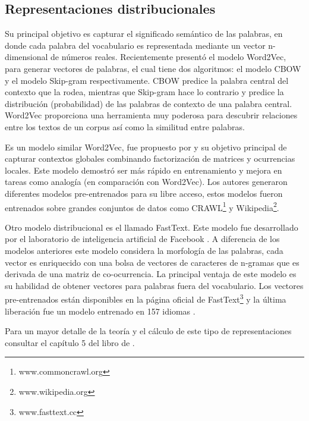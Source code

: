 \subsection{Representaciones distribucionales}
Su principal objetivo es capturar el significado semántico de las palabras, en donde cada palabra del vocabulario es representada mediante un vector n-dimensional de números reales. Recientemente \citep{mikolov2013distributed} presentó el modelo Word2Vec, para generar vectores de palabras, el cual tiene dos algoritmos: el modelo CBOW y el modelo Skip-gram respectivamente. CBOW  predice la palabra central del contexto que la rodea, mientras que Skip-gram hace lo contrario y predice la distribución (probabilidad) de las palabras de contexto de una palabra central. Word2Vec proporciona una herramienta muy poderosa para descubrir relaciones entre los textos de un corpus así como la similitud entre palabras.

Es un modelo similar Word2Vec, fue propuesto por \citep{pennington2014glove} y su objetivo principal de capturar contextos globales combinando factorización de matrices y ocurrencias locales. Este modelo demostró ser más rápido en entrenamiento y mejora en tareas como analogía (en comparación con Word2Vec). Los autores generaron diferentes modelos pre-entrenados para su libre acceso, estos modelos fueron entrenados sobre grandes conjuntos de datos como CRAWL\footnote{www.commoncrawl.org} y Wikipedia\footnote{www.wikipedia.org}.

Otro modelo distribucional es el llamado FastText. Este modelo fue desarrollado por el laboratorio de inteligencia artificial de Facebook \citep{mikolov2017advances}. A diferencia de los modelos anteriores este modelo considera la morfología de las palabras, cada vector es enriquecido con una bolsa de vectores de caracteres de n-gramas que es derivada de una matriz de co-ocurrencia. La  principal ventaja de este modelo es su habilidad de obtener vectores para palabras fuera del vocabulario. Los vectores pre-entrenados están disponibles en la página oficial de FastText\footnote{www.fasttext.cc}  y la última liberación fue un modelo entrenado en 157 idiomas \citep{grave2018learning}.

Para un mayor detalle de la teoría y el cálculo de este tipo de representaciones consultar el capítulo 5 del libro de \citep{kamath2019deep}.